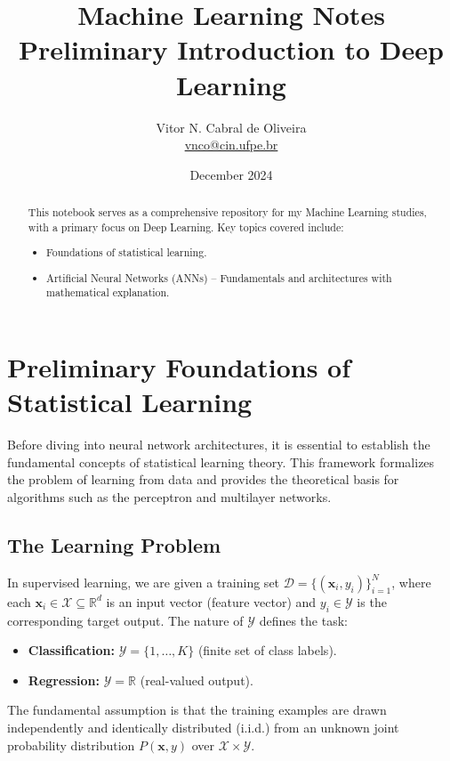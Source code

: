 \documentclass{tufte-handout}
\title{Machine Learning Notes \\ Preliminary Introduction to Deep Learning}
\author{Vitor N. Cabral de Oliveira\\ \href{mailto:vnco@cin.ufpe.br}{vnco@cin.ufpe.br}}
\date{December 2024}
\begin{document}
\maketitle
\begin{abstract}
    This notebook serves as a comprehensive repository for my Machine Learning studies, with a primary focus on Deep Learning. Key topics covered include:
    \begin{itemize}
        \item Foundations of statistical learning.
        \item Artificial Neural Networks (ANNs) – Fundamentals and architectures with mathematical explanation.
    \end{itemize}
\end{abstract}

\newpage
\hypersetup{linkcolor=wp-text}
\tableofcontents
\hypersetup{linkcolor=wp-primary}
\newpage

\section{Preliminary Foundations of Statistical Learning}

Before diving into neural network architectures, it is essential to establish the fundamental concepts of statistical learning theory. This framework formalizes the problem of learning from data and provides the theoretical basis for algorithms such as the perceptron and multilayer networks.

\subsection{The Learning Problem}

In supervised learning, we are given a training set $\mathcal{D} = \{(\mathbf{x}_i, y_i)\}_{i=1}^{N}$, where each $\mathbf{x}_i \in \mathcal{X} \subseteq \mathbb{R}^d$ is an input vector (feature vector) and $y_i \in \mathcal{Y}$ is the corresponding target output. The nature of $\mathcal{Y}$ defines the task:
\begin{itemize}
    \item \textbf{Classification:} $\mathcal{Y} = \{1,\dots, K\}$ (finite set of class labels).
    \item \textbf{Regression:} $\mathcal{Y} = \mathbb{R}$ (real-valued output).
\end{itemize}

The fundamental assumption is that the training examples are drawn independently and identically distributed (i.i.d.) from an unknown joint probability distribution $P(\mathbf{x}, y)$ over $\mathcal{X} \times \mathcal{Y}$.
\end{document}
